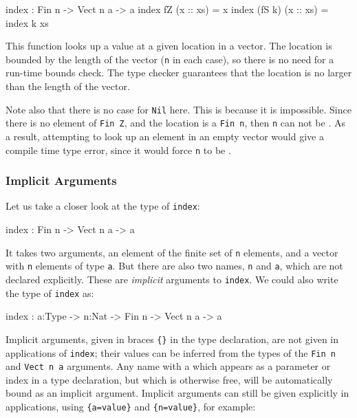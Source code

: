 \begin{code}
index : Fin n -> Vect n a -> a
index fZ     (x :: xs) = x
index (fS k) (x :: xs) = index k xs
\end{code}

\noindent
This function looks up a value at a given location in a vector.
The location is bounded by the length of the vector (\texttt{n} in each case), so there is no
need for a run-time bounds check.
The type checker guarantees that the location is no larger than the length of the vector.

Note also that there is no case for \texttt{Nil} here.
This is because it is impossible. Since there is no element of \texttt{Fin Z}, and the location is a \texttt{Fin n}, then \texttt{n} can not be . 
As a result, attempting to look up an element in an empty vector would give a compile time type error, since it would force \texttt{n} to be .

\subsubsection{Implicit Arguments}

Let us take a closer look at the type of \texttt{index}:

\begin{code}
index : Fin n -> Vect n a -> a
\end{code}

\noindent
It takes two arguments, an element of the finite set of \texttt{n} elements, and a vector with \texttt{n} elements of type \texttt{a}. But there are also two names, \texttt{n} and \texttt{a}, which are not declared  explicitly.
These are \emph{implicit} arguments to \texttt{index}. We could also write the type of \texttt{index} as:

\begin{code}
index : {a:Type} -> {n:Nat} -> Fin n -> Vect n a -> a
\end{code}

\noindent
Implicit arguments, given in braces \texttt{\{\}} in the type declaration, are not given in applications of \texttt{index}; their values can be inferred from the types of the \texttt{Fin n} and \texttt{Vect n a} arguments.
Any name with a  which appears as a parameter or index in a type declaration, but which is otherwise free, will be automatically bound as an implicit argument.
Implicit arguments can still be given explicitly in applications, using \texttt{\{a=value\}} and \texttt{\{n=value\}}, for example:

